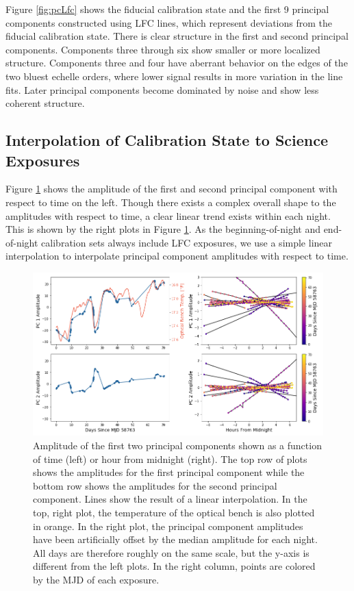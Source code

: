 \documentclass[modern]{aastex63}
\begin{document}
Figure \ref{fig:pcLfc} shows the fiducial calibration state and the first 9 principal components constructed using LFC lines, which represent deviations from the fiducial calibration state.  There is clear structure in the first and second principal components.  Components three through six show smaller or more localized structure.  Components three and four have aberrant behavior on the edges of the two bluest echelle orders, where lower signal results in more variation in the line fits.  Later principal components become dominated by noise and show less coherent structure.

\subsection{Interpolation of Calibration State to Science Exposures}
\label{sec:choice_avt}
Figure \ref{fig:nightlyVariation} shows the amplitude of the first and second principal component with respect to time on the left.  Though there exists a complex overall shape to the amplitudes with respect to time, a clear linear trend exists within each night.  This is shown by the right plots in Figure  \ref{fig:nightlyVariation}.  As the beginning-of-night and end-of-night calibration sets always include LFC exposures, we use a simple linear interpolation to interpolate principal component amplitudes with respect to time.

\begin{figure}[t]
\centering
\includegraphics[width=\textwidth]{Figures/pcAs_byDay.png}
\caption{Amplitude of the first two principal components shown as a function of time (left) or hour from midnight (right).  The top row of plots shows the amplitudes for the first principal component while the bottom row shows the amplitudes for the second principal component.  Lines show the result of a linear interpolation.  In the top, right plot, the temperature of the optical bench is also plotted in orange.  In the right plot, the principal component amplitudes have been artificially offset by the median amplitude for each night.  All days are therefore roughly on the same scale, but the y-axis is different from the left plots.  In the right column, points are colored by the MJD of each exposure.}
\label{fig:nightlyVariation}
\end{figure} 
\end{document}
